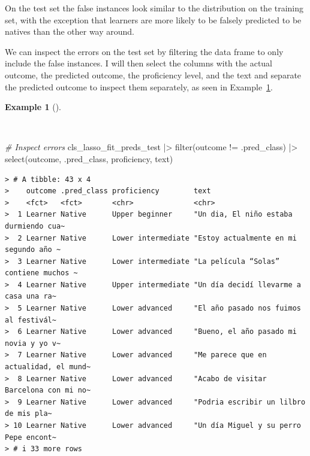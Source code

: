 \documentclass[
  letterpaper,
  DIV=11,
  numbers=noendperiod]{scrreprt}
\newenvironment{Shaded}{\begin{snugshade}}{\end{snugshade}}
\newcommand{\CommentTok}[1]{\textcolor[rgb]{0.00,0.00,0.00}{\textit{#1}}}
\newcommand{\FunctionTok}[1]{\textcolor[rgb]{0.00,0.00,0.00}{#1}}
\newcommand{\NormalTok}[1]{\textcolor[rgb]{0.00,0.00,0.00}{#1}}
\newcommand{\SpecialCharTok}[1]{\textcolor[rgb]{0.00,0.00,0.00}{#1}}
\theoremstyle{definition}
\newtheorem{example}{Example}[chapter]
\theoremstyle{remark}
\begin{document}
On the test set the false instances look similar to the distribution on
the training set, with the exception that learners are more likely to be
falsely predicted to be natives than the other way around.

We can inspect the errors on the test set by filtering the data frame to
only include the false instances. I will then select the columns with
the actual outcome, the predicted outcome, the proficiency level, and
the text and separate the predicted outcome to inspect them separately,
as seen in
Example~\ref{exm-pda-class-tune-hyperparameters-evaluate-test-errors}.

\begin{example}[]\protect\hypertarget{exm-pda-class-tune-hyperparameters-evaluate-test-errors}{}\label{exm-pda-class-tune-hyperparameters-evaluate-test-errors}

~

\begin{Shaded}
\begin{Highlighting}[]
\CommentTok{\# Inspect errors}
\NormalTok{cls\_lasso\_fit\_preds\_test }\SpecialCharTok{|\textgreater{}}
  \FunctionTok{filter}\NormalTok{(outcome }\SpecialCharTok{!=}\NormalTok{ .pred\_class) }\SpecialCharTok{|\textgreater{}}
  \FunctionTok{select}\NormalTok{(outcome, .pred\_class, proficiency, text)}
\end{Highlighting}
\end{Shaded}

\begin{verbatim}
> # A tibble: 43 x 4
>    outcome .pred_class proficiency        text                                  
>    <fct>   <fct>       <chr>              <chr>                                 
>  1 Learner Native      Upper beginner     "Un dia, El niño estaba durmiendo cua~
>  2 Learner Native      Lower intermediate "Estoy actualmente en mi segundo año ~
>  3 Learner Native      Lower intermediate "La película “Solas” contiene muchos ~
>  4 Learner Native      Upper intermediate "Un día decidí llevarme a casa una ra~
>  5 Learner Native      Lower advanced     "El año pasado nos fuimos al festivál~
>  6 Learner Native      Lower advanced     "Bueno, el año pasado mi novia y yo v~
>  7 Learner Native      Lower advanced     "Me parece que en actualidad, el mund~
>  8 Learner Native      Lower advanced     "Acabo de visitar Barcelona con mi no~
>  9 Learner Native      Lower advanced     "Podria escribir un lilbro de mis pla~
> 10 Learner Native      Lower advanced     "Un día Miguel y su perro Pepe encont~
> # i 33 more rows
\end{verbatim}


\end{example}
\end{document}

